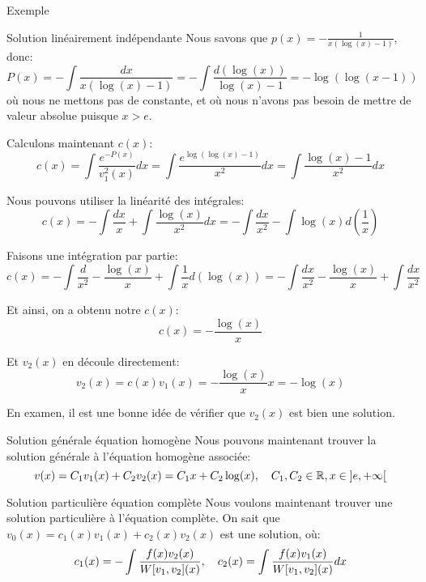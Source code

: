 \documentclass[a4paper]{article}
\begin{document}
\begin{parag}{Exemple}
\begin{subparag}{Solution linéairement indépendante}
     Nous savons que $p\left(x\right) = -\frac{1}{x \left(\log\left(x\right) - 1\right)}$, donc:
     \[P\left(x\right) = - \int \frac{dx}{x\left(\log\left(x\right) - 1\right)} = -\int \frac{d\left(\log\left(x\right)\right)}{\log\left(x\right) - 1} = -\log\left(\log\left(x - 1\right)\right)\]
     où nous ne mettons pas de constante, et où nous n'avons pas besoin de mettre de valeur absolue puisque $x > e$.

     Calculons maintenant $c\left(x\right)$:
     \[c\left(x\right) = \int \frac{e^{-P\left(x\right)}}{v_1^2\left(x\right)} dx = \int \frac{e^{\log\left(\log\left(x\right) - 1\right)}}{x^2} dx = \int \frac{\log\left(x\right) - 1}{x^2} dx\]

     Nous pouvons utiliser la linéarité des intégrales:
     \[c\left(x\right) = - \int \frac{dx}{x} + \int \frac{\log\left(x\right)}{x^2}dx = - \int \frac{dx}{x^2} - \int \log\left(x\right)d\left(\frac{1}{x}\right)\]

     Faisons une intégration par partie:
     \[c\left(x\right) = - \int \frac{d}{x^2} - \frac{\log\left(x\right)}{x} + \int \frac{1}{x} d\left(\log\left(x\right)\right) = - \int \frac{dx}{x^2} - \frac{\log\left(x\right)}{x} + \int \frac{dx}{x^2}\]

     Et ainsi, on a obtenu notre $c\left(x\right)$:
     \[c\left(x\right) = -\frac{\log\left(x\right)}{x}\]

     Et $v_2\left(x\right)$ en découle directement:
     \[v_2\left(x\right) = c\left(x\right)v_1\left(x\right) = - \frac{\log\left(x\right)}{x} x = -\log\left(x\right)\]


     En examen, il est une bonne idée de vérifier que $v_2\left(x\right)$ est bien une solution.
    \end{subparag}

    \begin{subparag}{Solution générale équation homogène}
     Nous pouvons maintenant trouver la solution générale à l'équation homogène associée:
     \[v\left(x\right)= C_1 v_1\left(x\right) + C_2 v_2\left(x\right) = C_1 x + C_2 \log\left(x\right), \mathspace C_1, C_2 \in \mathbb{R}, x \in \left]e, +\infty\right[ \]
    \end{subparag}

    \begin{subparag}{Solution particulière équation complète}
     Nous voulons maintenant trouver une solution particulière à l'équation complète. On sait que $v_{0}\left(x\right) = c_1\left(x\right) v_1\left(x\right) + c_2\left(x\right) v_2\left(x\right)$ est une solution, où:
     \[c_1\left(x\right) = - \int \frac{f\left(x\right) v_2\left(x\right)}{W\left[v_1, v_2\right]\left(x\right)}, \mathspace c_2\left(x\right) = \int \frac{f\left(x\right) v_1\left(x\right)}{W\left[v_1, v_2\right]\left(x\right)} dx\]


\end{subparag}
\end{parag}
\end{document}

